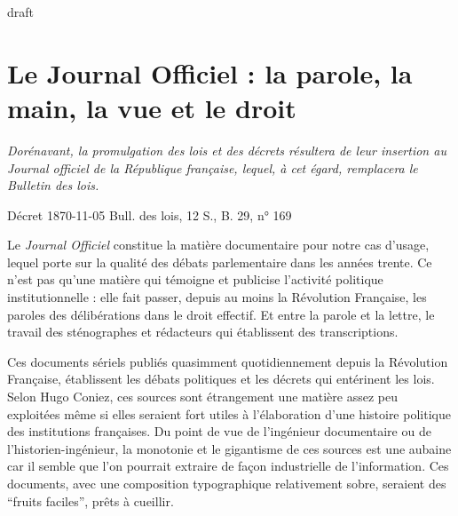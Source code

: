 draft

	
\chapter{Le Journal Officiel : la parole, la main, la vue et le droit}
\epigraph{\itshape Dorénavant, la promulgation des lois et des décrets résultera de leur insertion au Journal officiel de la République
	française, lequel, à cet égard, remplacera le Bulletin des lois.}{Décret 1870-11-05 Bull. des lois, 12 S., B. 29, n° 169}


Le \textit{Journal Officiel} constitue la matière documentaire pour notre cas d'usage, lequel porte sur la qualité des débats parlementaire dans les années trente. Ce n'est pas qu'une matière qui témoigne et publicise l'activité politique institutionnelle : elle fait passer, depuis au moins la Révolution Française, les paroles des délibérations dans le droit effectif. Et entre la parole et la lettre, le travail des sténographes et rédacteurs qui établissent des transcriptions. 

Ces documents sériels publiés quasimment quotidiennement depuis la Révolution Française, établissent les débats politiques et les décrets qui entérinent les lois. Selon Hugo Coniez, ces sources sont étrangement une matière assez peu exploitées même si elles seraient fort utiles à l'élaboration d'une histoire politique des institutions françaises. Du point de vue de l'ingénieur documentaire ou de l'historien-ingénieur, la monotonie et le gigantisme de ces sources est une aubaine car il semble que l'on pourrait extraire de façon industrielle de l'information. Ces documents, avec une composition typographique relativement sobre, seraient des \enquote{fruits faciles}, prêts à cueillir. 

